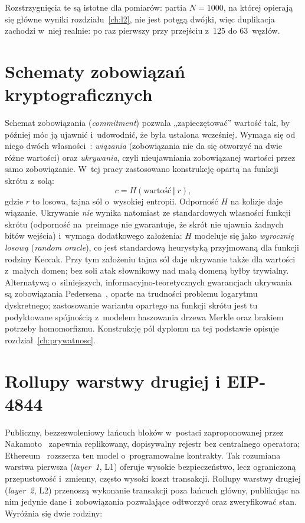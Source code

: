 \noindent Rozstrzygnięcia te są istotne dla pomiarów: partia $N=1000$, na której
opierają się główne wyniki rozdziału~\ref{ch:l2}, nie jest potęgą dwójki, więc
duplikacja zachodzi w~niej realnie: po raz pierwszy przy przejściu z~125 do
63~węzłów.

\section{Schematy zobowiązań kryptograficznych}
\label{sec:zobowiazania}

Schemat zobowiązania (\emph{commitment}) pozwala „zapieczętować'' wartość tak, by
później móc ją ujawnić i~udowodnić, że była ustalona wcześniej. Wymaga się od niego
dwóch własności~\cite{bonehshoup}: \emph{wiązania} (zobowiązania nie da się
otworzyć na dwie różne wartości) oraz \emph{ukrywania}, czyli nieujawniania
zobowiązanej wartości przez samo zobowiązanie. W~tej pracy zastosowano konstrukcję
opartą na funkcji skrótu z~solą:
\[
  c = H(\text{wartość} \,\Vert\, r),
\]
gdzie $r$ to losowa, tajna sól o~wysokiej entropii. Odporność $H$ na kolizje daje
wiązanie. Ukrywanie \emph{nie} wynika natomiast ze standardowych własności funkcji
skrótu (odporność na~preimage nie gwarantuje, że skrót nie ujawnia żadnych bitów
wejścia) i~wymaga dodatkowego założenia: $H$ modeluje się jako \emph{wyrocznię
losową} (\emph{random oracle}), co jest standardową heurystyką przyjmowaną dla
funkcji rodziny Keccak. Przy tym założeniu tajna sól daje ukrywanie także dla
wartości z~małych domen; bez soli atak słownikowy nad małą domeną byłby trywialny.
Alternatywą o~silniejszych,
informacyjno-teoretycznych gwarancjach ukrywania są zobowiązania
Pedersena~\cite{pedersen1991}, oparte na trudności problemu logarytmu dyskretnego;
zastosowanie wariantu opartego na funkcji skrótu jest tu podyktowane spójnością
z~modelem haszowania drzewa Merkle oraz brakiem potrzeby homomorfizmu.
Konstrukcję pól dyplomu na tej podstawie opisuje rozdział~\ref{ch:prywatnosc}.

\section{Rollupy warstwy drugiej i EIP-4844}
\label{sec:l2-podstawy}

Publiczny, bezzezwoleniowy łańcuch bloków w~postaci zaproponowanej przez
Nakamoto~\cite{nakamoto2008} zapewnia replikowany, dopisywalny rejestr bez
centralnego operatora; Ethereum~\cite{ethereum} rozszerza ten model o~programowalne
kontrakty. Tak rozumiana warstwa pierwsza (\emph{layer~1}, L1) oferuje wysokie
bezpieczeństwo, lecz ograniczoną przepustowość i~zmienny, często wysoki koszt
transakcji. Rollupy
warstwy drugiej (\emph{layer~2}, L2) przenoszą wykonanie transakcji poza łańcuch
główny, publikując na nim jedynie dane i~zobowiązania pozwalające odtworzyć oraz
zweryfikować stan. Wyróżnia się dwie rodziny:

